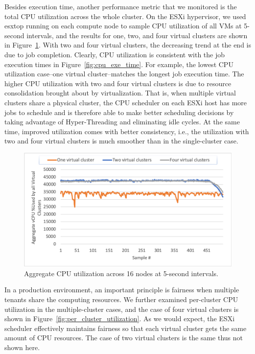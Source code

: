 Besides execution time, another performance metric that we monitored is the total CPU utilization across the whole cluster. On the ESXi hypervisor, we used esxtop running on each compute node to sample CPU utilization of all VMs at 5-second intervals, and the results for one, two, and four virtual clusters are shown in Figure~\ref{fig:cpu_utilizations}. With two and four virtual clusters, the decreasing trend at the end is due to job completion. Clearly, CPU utilization is consistent with the job execution times in Figure~\ref{fig:cpu_exe_time}. For example, the lowest CPU utilization case--one virtual cluster--matches the longest job execution time. The higher CPU utilization with two and four virtual clusters is due to resource consolidation brought about by virtualization. That is, when multiple virtual clusters share a physical cluster, the CPU scheduler on each ESXi host has more jobs to schedule and is therefore able to make better scheduling decisions by taking advantage of Hyper-Threading and eliminating idle cycles. At the same time, improved utilization comes with better consistency, i.e., the utilization with two and four virtual clusters is much smoother than in the single-cluster case.

\begin{figure}[!t]
   \begin{center}
       \includegraphics[width=\columnwidth]{Figures/cpu_utilizations}
   \end{center}
   \caption{Aggregate CPU utilization across 16 nodes at 5-second intervals.}
   \label{fig:cpu_utilizations}
   \vspace{-0.2in}
 \end{figure}

 In a production environment, an important principle is fairness when multiple tenants share the computing resources. We further examined per-cluster CPU utilization in the multiple-cluster cases, and the case of four virtual clusters is shown in Figure~\ref{fig:per_cluster_utilization}. As we would expect, the ESXi scheduler effectively maintains fairness so that each virtual cluster gets the same amount of CPU resources. The case of two virtual clusters is 
 the same thus not shown here. 


